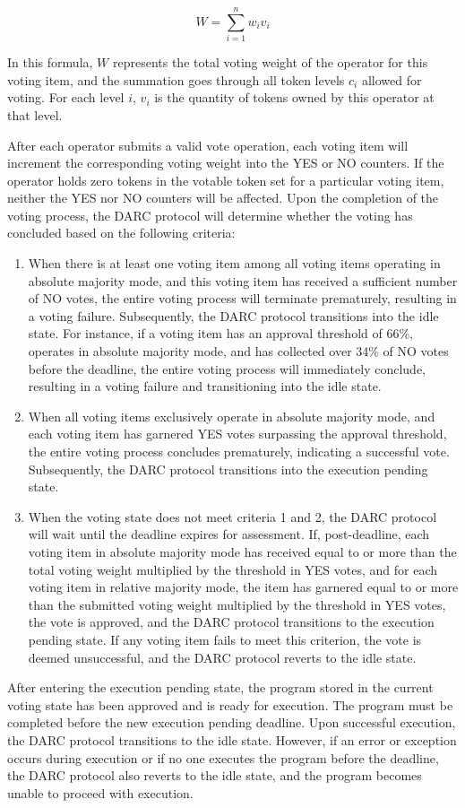 \documentclass[main.tex]{subfiles}
\begin{document}
\[
W = \sum_{i=1}^{n} w_i v_i
\]

In this formula, \(W\) represents the total voting weight of the operator for this voting item, and the summation goes through all token levels \(c_i\) allowed for voting. For each level \(i\), \(v_i\) is the quantity of tokens owned by this operator at that level.

After each operator submits a valid vote operation, each voting item will increment the corresponding voting weight into the YES or NO counters. If the operator holds zero tokens in the votable token set for a particular voting item, neither the YES nor NO counters will be affected. Upon the completion of the voting process, the DARC protocol will determine whether the voting has concluded based on the following criteria:

\begin{enumerate}

    \item When there is at least one voting item among all voting items operating in absolute majority mode, and this voting item has received a sufficient number of NO votes, the entire voting process will terminate prematurely, resulting in a voting failure. Subsequently, the DARC protocol transitions into the idle state. For instance, if a voting item has an approval threshold of 66\%, operates in absolute majority mode, and has collected over 34\% of NO votes before the deadline, the entire voting process will immediately conclude, resulting in a voting failure and transitioning into the idle state.

    \item When all voting items exclusively operate in absolute majority mode, and each voting item has garnered YES votes surpassing the approval threshold, the entire voting process concludes prematurely, indicating a successful vote. Subsequently, the DARC protocol transitions into the execution pending state.
    
    \item When the voting state does not meet criteria 1 and 2, the DARC protocol will wait until the deadline expires for assessment. If, post-deadline, each voting item in absolute majority mode has received equal to or more than the total voting weight multiplied by the threshold in YES votes, and for each voting item in relative majority mode, the item has garnered equal to or more than the submitted voting weight multiplied by the threshold in YES votes, the vote is approved, and the DARC protocol transitions to the execution pending state. If any voting item fails to meet this criterion, the vote is deemed unsuccessful, and the DARC protocol reverts to the idle state.
\end{enumerate}

After entering the execution pending state, the program stored in the current voting state has been approved and is ready for execution. The program must be completed before the new execution pending deadline. Upon successful execution, the DARC protocol transitions to the idle state. However, if an error or exception occurs during execution or if no one executes the program before the deadline, the DARC protocol also reverts to the idle state, and the program becomes unable to proceed with execution.
\end{document}
